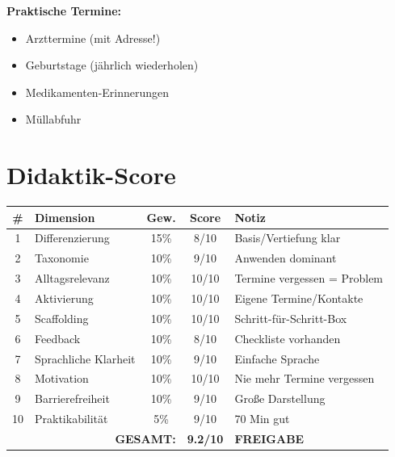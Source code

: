 \documentclass[11pt,a4paper]{article}
\begin{document}
\textbf{Praktische Termine:}
\begin{itemize}
    \item Arzttermine (mit Adresse!)
    \item Geburtstage (jährlich wiederholen)
    \item Medikamenten-Erinnerungen
    \item Müllabfuhr
\end{itemize}

\section{Didaktik-Score}

\begin{scorebox}
\begin{tabular}{|c|l|c|c|p{3.5cm}|}
\hline
\# & Dimension & Gew. & Score & Notiz \\
\hline
1 & Differenzierung & 15\% & 8/10 & Basis/Vertiefung klar \\
2 & Taxonomie & 10\% & 9/10 & Anwenden dominant \\
3 & Alltagsrelevanz & 10\% & 10/10 & Termine vergessen = Problem \\
4 & Aktivierung & 10\% & 10/10 & Eigene Termine/Kontakte \\
5 & Scaffolding & 10\% & 10/10 & Schritt-für-Schritt-Box \\
6 & Feedback & 10\% & 8/10 & Checkliste vorhanden \\
7 & Sprachliche Klarheit & 10\% & 9/10 & Einfache Sprache \\
8 & Motivation & 10\% & 10/10 & Nie mehr Termine vergessen \\
9 & Barrierefreiheit & 10\% & 9/10 & Große Darstellung \\
10 & Praktikabilität & 5\% & 9/10 & 70 Min gut \\
\hline
\multicolumn{3}{|r|}{\textbf{GESAMT:}} & \textbf{9.2/10} & \textcolor{successgreen}{\textbf{FREIGABE}} \\
\hline
\end{tabular}
\end{scorebox}
\end{document}
